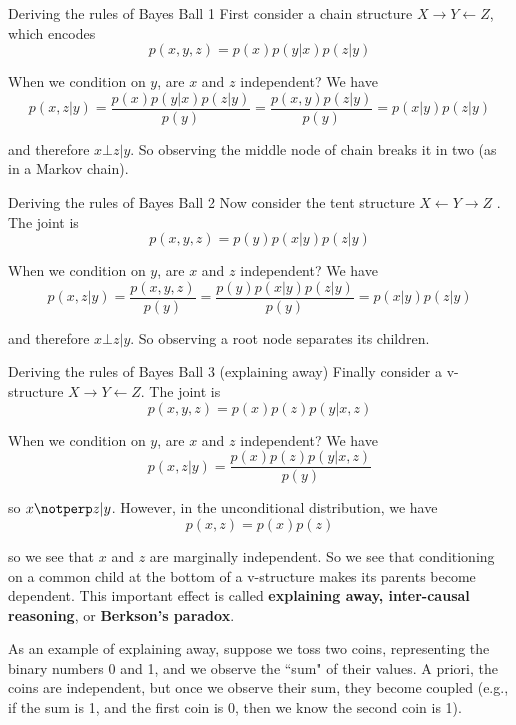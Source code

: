 \documentclass[10pt,mathserif]{beamer}
\begin{document}
\begin{frame}{Deriving the rules of Bayes Ball 1}
First consider a chain structure $X \rightarrow Y \leftarrow Z$, which encodes
\begin{equation}
    p(x, y, z) = p(x)p(y|x)p(z|y)
\end{equation}

When we condition on $y$, are $x$ and $z$ independent? We have
\begin{equation}
    p(x, z|y) = \frac{p(x)p(y|x)p(z|y)}{p(y)} = \frac{p(x, y)p(z|y)}{p(y)} = p(x|y)p(z|y)
\end{equation}

and therefore $x \bot z|y$. So observing the middle node of chain breaks it in two (as in a Markov chain).  
\end{frame}

\begin{frame}{Deriving the rules of Bayes Ball 2}
Now consider the tent structure $X \leftarrow Y \rightarrow Z$ . The joint is
\begin{equation}
    p(x, y, z) = p(y)p(x|y)p(z|y)
\end{equation}

When we condition on $y$, are $x$ and $z$ independent? We have
\begin{equation}
    p(x, z|y) = \frac{p(x, y, z)}{p(y)} = \frac{p(y)p(x|y)p(z|y)}{p(y)} = p(x|y)p(z|y)
\end{equation}

and therefore $x \bot z|y$. So observing a root node separates its children.
\end{frame}

\begin{frame}{Deriving the rules of Bayes Ball 3 (explaining away)}
Finally consider a v-structure $X \rightarrow Y \leftarrow Z$. The joint is
\begin{equation}
    p(x, y, z) = p(x)p(z)p(y|x, z)
\end{equation}

When we condition on $y$, are $x$ and $z$ independent? We have
\begin{equation}
    p(x, z|y) = \frac{p(x)p(z)p(y|x, z)}{p(y)}
\end{equation}

so $x \notperp z|y$. However, in the unconditional distribution, we have
\begin{equation}
    p(x, z) = p(x)p(z)
\end{equation}

so we see that $x$ and $z$ are marginally independent. So we see that conditioning on a common child at the bottom of a v-structure makes its parents become dependent. This important effect is called \textbf{explaining away, inter-causal reasoning}, or \textbf{Berkson's paradox}.\bigskip

As an example of explaining away, suppose we toss two coins, representing the binary numbers 0 and 1, and we observe the ``sum" of their values. A priori, the coins are independent, but once we observe their sum, they become coupled (e.g., if the sum is 1, and the first coin is 0, then we know the second coin is 1).
\end{frame}
\end{document}
